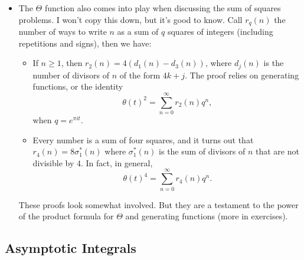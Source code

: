 \documentclass[11pt,
        usenames, %
        dvipsnames %
    ]{report}
\newcommand*{\p}[1]{\left(#1\right)}
\begin{document}
\begin{itemize}
    \item The $\Theta$ function also comes into play when discussing the sum of
        squares problems. I won't copy this down, but it's good to know. Call
        $r_q(n)$ the number of ways to write $n$ as a sum of $q$ squares of
        integers (including repetitions and signs), then we have:
        \begin{itemize}
            \item If $n \geq 1$, then $r_2(n) = 4\p{d_1(n) - d_3(n)}$, where
                $d_j(n)$ is the number of divisors of $n$ of the form $4k + j$.
                The proof relies on generating functions, or the identity
                \begin{equation}
                    \theta(t)^2 = \sum\limits_{n = 0}^\infty r_2(n) q^n,
                \end{equation}
                when $q = e^{\pi i t}$.

            \item Every number is a sum of four squares, and it turns out that
                $r_4(n) = 8\sigma_1^*(n)$ where $\sigma_1^*(n)$ is the sum of
                divisors of $n$ that are not divisible by $4$. In fact, in
                general,
                \begin{equation}
                    \theta(t)^4 = \sum\limits_{n = 0}^\infty r_4(n)q^n.
                \end{equation}
        \end{itemize}
        These proofs look somewhat involved. But they are a testament to the
        power of the product formula for $\Theta$ and generating functions (more
        in exercises).
\end{itemize}

\subsection{Asymptotic Integrals}
\end{document}
